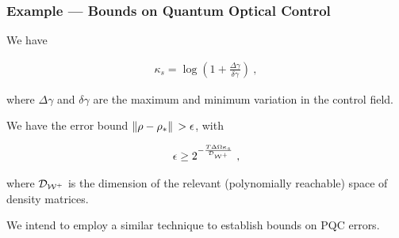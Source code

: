 \begin{frame}
    \frametitle{Example --- Bounds on Quantum Optical Control}
    
    We have

    \begin{gather*}
        \kappa_s = \log (1 + \frac{\Delta\gamma}{\delta\gamma})~,
    \end{gather*}

    where \(\Delta\gamma\) and \(\delta\gamma\) are the maximum and minimum
    variation in the control field.

    We have the error bound \cite{lloyd2014information} \(\norm*{\rho-\rho_*} >
    \epsilon\), with

    \begin{gather*}
        \epsilon \geq 2^{-\frac{T\Delta\Omega\kappa_s}{\mathcal{D}_{\mathcal{W^+}}}}~,
    \end{gather*}

    where \(\mathcal{D}_{\mathcal{W^+}}\) is the dimension of the relevant
    (polynomially reachable) space of density matrices.

    We intend to employ a similar technique to establish bounds on PQC errors.

\end{frame}


